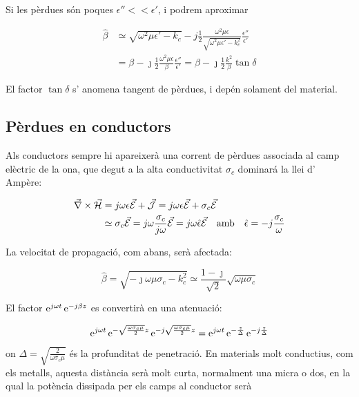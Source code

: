 Si les pèrdues són poques $\epsilon '' << \epsilon '$, i podrem aproximar

\begin{align}
  \hat \beta &\simeq  \sqrt{\omega^2 \mu\epsilon' - k_c} - j \frac{1}{2}\frac{\omega ^2 \mu\epsilon}{\sqrt{\omega ^2 \mu\epsilon ' - k_c ^2 }} \frac{\epsilon ''}{\epsilon '} \\ &= \beta - \jmath \frac{1}{2}\frac{\omega^2 \mu\epsilon}{\beta} \frac{\epsilon ''}{\epsilon'} 
= \beta -\jmath \frac{1}{2} \frac{k^2}{\beta }\tan \delta \nonumber 
\end{align}

El factor $\tan \delta$ s' anomena tangent de pèrdues, i depén solament del material.

\subsection{Pèrdues en conductors}

Als conductors sempre hi apareixerà una corrent de pèrdues associada al camp elèctric de la ona, que degut a la alta conductivitat $\sigma_c$ dominará la llei d' Ampère:

\begin{align}
  \vec \nabla \times \vec{\mathcal{H}} &= j \omega \epsilon \vec{\mathcal{E}} + \vec{\mathcal{J}} = j \omega \epsilon \vec{\mathcal{E}} + \sigma _c \vec{\mathcal{E}} \\
 &\simeq \sigma _c \vec{\mathcal{E}} =  j \omega \frac{\sigma _c}{j \omega} \vec{\mathcal{E}} = j \omega \hat \epsilon \vec{\mathcal{E}} \quad \text{amb} \quad \hat \epsilon = -j \frac{\sigma _c }{\omega} \nonumber
\end{align}

La velocitat de propagació, com abans, serà afectada:

\begin{equation}
  \hat \beta = \sqrt{-\jmath\omega \mu\sigma_c - k_c ^2} \simeq \frac{1-\jmath}{\sqrt 2} \sqrt{\omega \mu \sigma _c }
\end{equation}

El factor $\operatorname{e}^{j \omega t}\operatorname{e}^{-j \beta z} $ es convertirà en una atenuació:

\begin{equation}
  \operatorname{e}^{j \omega t} \operatorname{e}^{ -\sqrt{\frac{\omega \sigma_c \mu}{2}} z} \operatorname{e}^{-j \sqrt{\frac{\omega \sigma_c \mu}{2}} z}  = \operatorname{e}^{j \omega t} \operatorname{e}^{- \frac{z}{\Delta}} \operatorname{e}^{-j \frac{z}{\Delta}}
\end{equation}

on $ \Delta = \sqrt{\frac{2}{\omega \sigma _c \mu}}$ és la profunditat de penetració. En materials molt conductius, com els metalls, aquesta distància serà molt curta, normalment una micra o dos, en la qual la potència dissipada per els camps al conductor serà

